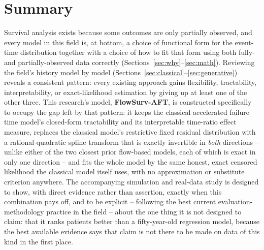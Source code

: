 \documentclass[11pt]{article}
\begin{document}
\section{Summary}
\label{sec:summary}

Survival analysis exists because some outcomes are only partially
observed, and every model in this field is, at bottom, a choice of
functional form for the event-time distribution together with a choice
of how to fit that form using both fully- and partially-observed data
correctly (Sections~\ref{sec:why}--\ref{sec:math}). Reviewing the field's
history model by model (Sections~\ref{sec:classical}--\ref{sec:generative})
reveals a consistent pattern: every existing approach gains flexibility,
tractability, interpretability, or exact-likelihood estimation by giving
up at least one of the other three. This research's model,
\textbf{FlowSurv-AFT}, is constructed specifically to occupy the gap left
by that pattern: it keeps the classical accelerated failure time model's
closed-form tractability and its interpretable time-ratio effect measure,
replaces the classical model's restrictive fixed residual distribution
with a rational-quadratic spline transform that is exactly invertible in
\emph{both} directions -- unlike either of the two closest prior flow-based
models, each of which is exact in only one direction -- and fits the
whole model by the same honest, exact censored likelihood the classical
model itself uses, with no approximation or substitute criterion
anywhere. The accompanying simulation and real-data study is designed to
show, with direct evidence rather than assertion, exactly when this
combination pays off, and to be explicit -- following the best current
evaluation-methodology practice in the field -- about the one thing it is
not designed to claim: that it ranks patients better than a fifty-year-old
regression model, because the best available evidence says that claim is
not there to be made on data of this kind in the first place.



\end{document}
